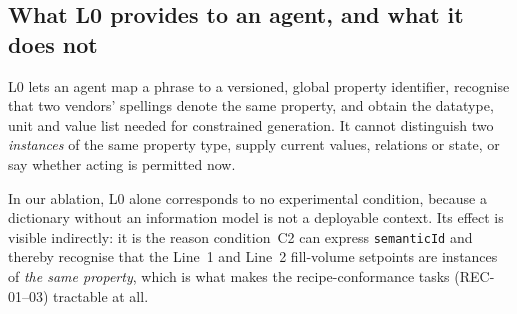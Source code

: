 \subsection{What L0 provides to an agent, and what it does not}

L0 lets an agent map a phrase to a versioned, global property identifier,
recognise that two vendors' spellings denote the same property, and obtain the
datatype, unit and value list needed for constrained generation. It cannot
distinguish two \emph{instances} of the same property type, supply current
values, relations or state, or say whether acting is permitted now.

In our ablation, L0 alone corresponds to no experimental condition, because a
dictionary without an information model is not a deployable context. Its effect
is visible indirectly: it is the reason condition~C2 can express
\texttt{semanticId} and thereby recognise that the Line~1 and Line~2 fill-volume
setpoints are instances of \emph{the same property}, which is what makes the
recipe-conformance tasks (REC-01--03) tractable at all.

